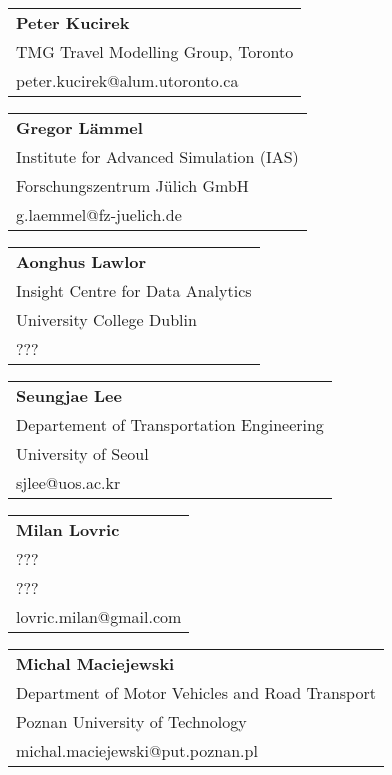 \begin{tabular}[width=0.48\textwidth]{l}
\textbf{Peter Kucirek} \\
TMG Travel Modelling Group, Toronto \\
peter.kucirek@alum.utoronto.ca  \\
\end{tabular}

\begin{tabular}[width=0.48\textwidth]{l}
\textbf{Gregor Lämmel} \\
Institute for Advanced Simulation (IAS) \\
Forschungszentrum Jülich GmbH \\
g.laemmel@fz-juelich.de \\
\end{tabular}

\begin{tabular}[width=0.48\textwidth]{l}
\textbf{Aonghus Lawlor} \\
Insight Centre for Data Analytics \\
University College Dublin \\
??? \\
\end{tabular}

\begin{tabular}[width=0.48\textwidth]{l}
\textbf{Seungjae Lee} \\
Departement of Transportation Engineering \\
University of Seoul \\
sjlee@uos.ac.kr \\
\end{tabular}

\begin{tabular}[width=0.48\textwidth]{l}
\textbf{Milan Lovric} \\
??? \\
??? \\
lovric.milan@gmail.com  \\
\end{tabular}

\begin{tabular}[width=0.48\textwidth]{l}
\textbf{Michal Maciejewski} \\
Department of Motor Vehicles and Road Transport \\
Poznan University of Technology \\
michal.maciejewski@put.poznan.pl \\
\end{tabular}

